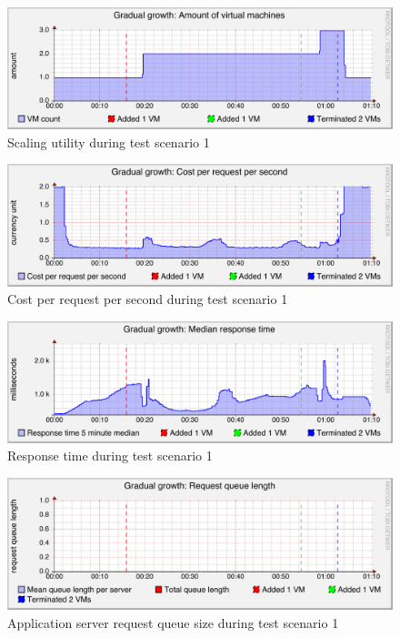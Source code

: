 \documentclass[english]{tktltiki2}
\theoremstyle{definition}
\theoremstyle{remark}
\begin{document}
\begin{figure}[htbp]
	\includegraphics[width=\textwidth]{images/vmcountgraph-test21}
	\caption{Scaling utility during test scenario 1}
	\label{fig:vmCountScenario1}
\end{figure}

\begin{figure}[htbp]
	\includegraphics[width=\textwidth]{images/costperrequestpersecondgraph-test21}
	\caption{Cost per request per second during test scenario 1}
	\label{fig:costScenario1}
\end{figure}

\begin{figure}[htbp]
	\includegraphics[width=\textwidth]{images/responsetimegraph-test21}
	\caption{Response time during test scenario 1}
	\label{fig:responseTimeScenario1}
\end{figure}

\begin{figure}[htbp]
	\includegraphics[width=\textwidth]{images/queuesizegraph-test21}
	\caption{Application server request queue size during test scenario 1}
	\label{fig:queueScenario1}
\end{figure}
\end{document}
